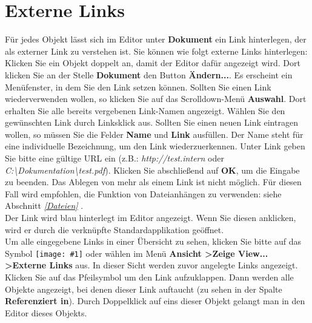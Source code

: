 \documentclass[a4paper,10pt]{book}
\newcommand{\icon}[1]{\texttt{[image: \#1]}}
\begin{document}
\section{Externe Links}
Für jedes Objekt lässt sich im Editor unter \textbf{Dokument} ein Link hinterlegen, der als externer Link zu verstehen ist. Sie können wie folgt externe
Links hinterlegen: Klicken Sie ein Objekt doppelt an, damit der Editor dafür angezeigt wird. Dort klicken Sie an der Stelle \textbf{Dokument} den Button
\textbf{Ändern...}. Es erscheint ein Menüfenster, in dem Sie den Link setzen können. Sollten Sie einen Link wiederverwenden wollen, so klicken Sie auf das
Scrolldown-Menü \textbf{Auswahl}. Dort erhalten Sie alle bereits vergebenen Link-Namen angezeigt. Wählen Sie den gewünschten Link durch Linksklick aus.
Sollten Sie einen neuen Link eintragen wollen, so müssen Sie die Felder \textbf{Name} und \textbf{Link} ausfüllen. Der Name steht für eine individuelle Bezeichnung,
um den Link wiederzuerkennen. Unter Link geben Sie bitte eine gültige URL ein (z.B.: {\em http://test.intern} oder {\em C:\textbackslash Dokumentation\textbackslash test.pdf}).
Klicken Sie abschließend auf \textbf{OK}, um die Eingabe zu beenden. Das Ablegen von mehr als einem Link ist nicht möglich. Für diesen Fall wird empfohlen,
die Funktion von Dateianhängen zu verwenden: siehe Abschnitt {\em \ref{Dateien} }.
\newline\\
Der Link wird blau hinterlegt im Editor angezeigt. Wenn Sie diesen anklicken, wird er durch die verknüpfte Standardapplikation geöffnet.
\newline\\
Um alle eingegebene Links in einer Übersicht zu sehen, klicken Sie bitte auf das Symbol \icon{Icon/Richtlinien.png} oder wählen im Menü
\textbf{Ansicht \textgreater Zeige View... \textgreater Externe Links} aus. In dieser Sicht werden zuvor angelegte Links angezeigt. Klicken Sie auf das Pfeilsymbol um
den Link aufzuklappen. Dann werden alle Objekte angezeigt, bei denen dieser Link auftaucht (zu sehen in der Spalte \textbf{Referenziert in}).
Durch Doppelklick auf eins dieser Objekt gelangt man in den Editor dieses Objekts.
\end{document}
